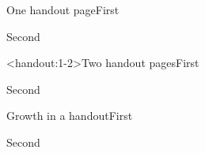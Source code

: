 \documentclass[handout]{beamer}
\begin{document}
\begin{frame}{One handout page}First\pause\par Second\end{frame}
\begin{frame}<handout:1-2>{Two handout pages}First\pause\par Second\end{frame}
\begin{frame}{Growth in a handout}First\pause\par Second\end{frame}
\end{document}
